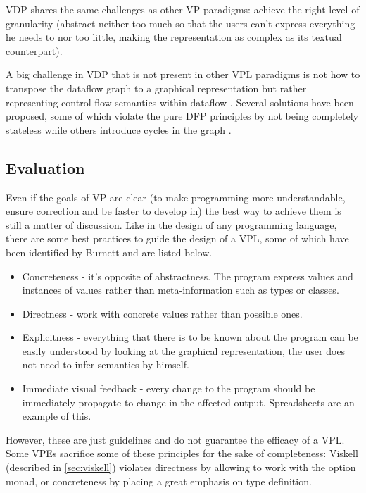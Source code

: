 VDP shares the same challenges as other VP paradigms: achieve the right level
of granularity (abstract neither too much so that the users can't express everything
he needs to nor too little, making the representation as complex as its textual
counterpart).

A big challenge in VDP that is not present in other VPL paradigms
is not how to transpose the dataflow graph to a graphical
representation but rather representing control flow semantics within dataflow
\cite{Cox2011}. Several solutions have been proposed, some of which violate
the pure DFP principles by not being completely stateless while others introduce
cycles in the graph \cite{Mosconi2000}.

\subsection{Evaluation}
\label{sec:eval}

Even if the goals of VP are clear (to make programming more understandable, ensure
correction and be faster to develop in) the best way to achieve them is still a matter of
discussion. Like in the design of any programming language, there are some
best practices to guide the design of a VPL, some of which have been identified
by Burnett \cite{Burnett1999} and are listed below.

\begin{itemize}
  \item Concreteness - it's opposite of abstractness. The program express values
and instances of values rather than meta-information such as types or classes.
  \item Directness - work with concrete values rather than possible ones.
  \item Explicitness - everything that there is to be known about the program
can be easily understood by looking at the graphical representation, the
user does not need to infer semantics by himself.
  \item Immediate visual feedback - every change to the program should be
immediately propagate to change in the affected output. Spreadsheets are an example of
this.
\end{itemize}

However, these are just guidelines and do not guarantee the efficacy of a VPL.
Some VPEs sacrifice some of these principles for the sake of completeness:
Viskell (described in \ref{sec:viskell}) violates directness by allowing to
work with the option monad, or concreteness by placing a great emphasis on type
definition.

